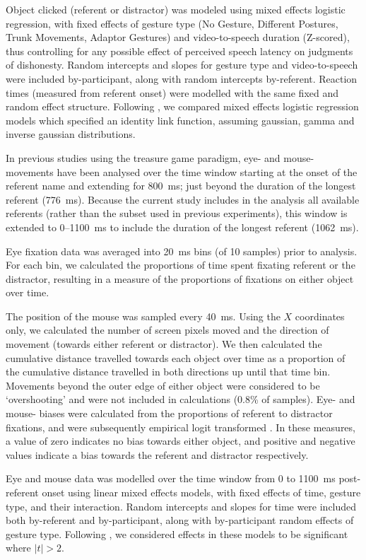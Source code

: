 \documentclass[a4paper,man,natbib]{apa6}
\begin{document}
Object clicked (referent or distractor) was modeled using mixed effects logistic regression, with fixed effects of gesture type (No Gesture, Different Postures, Trunk Movements, Adaptor Gestures) and video-to-speech duration (Z-scored), thus controlling for any possible effect of perceived speech latency on judgments of dishonesty.
Random intercepts and slopes for gesture type and video-to-speech were included by-participant, along with random intercepts by-referent.
Reaction times (measured from referent onset) were modelled with the same fixed and random effect structure.
Following \citet{Lo2015}, we compared mixed effects logistic regression models which specified an identity link function, assuming gaussian, gamma and inverse gaussian distributions.

In previous studies using the treasure game paradigm, eye- and mouse- movements have been analysed over the time window starting at the onset of the referent name and extending for 800~ms; just beyond the duration of the longest referent (776~ms). 
Because the current study includes in the analysis all available referents (rather than the subset used in previous experiments), this window is extended to 0--1100~ms to include the duration of the longest referent (1062~ms).

Eye fixation data was averaged into 20~ms bins (of 10 samples) prior to analysis.
For each bin, we calculated the proportions of time spent fixating referent or the distractor, resulting in a measure of the proportions of fixations on either object over time.

The position of the mouse was sampled every 40~ms.
Using the $X$ coordinates only, we calculated the number of screen pixels moved and the direction of movement (towards either referent or distractor).
We then calculated the cumulative distance travelled towards each object over time as a proportion of the cumulative distance travelled in both directions up until that time bin.
Movements beyond the outer edge of either object were considered to be `overshooting' and were not included in calculations (0.8\% of samples).
Eye- and mouse- biases were calculated from the proportions of referent to distractor fixations, and were subsequently empirical logit transformed \citep{Barr2008}. 
In these measures, a value of zero indicates no bias towards either object, and positive and negative values indicate a bias towards the referent and distractor respectively.

Eye and mouse data was modelled over the time window from 0 to 1100~ms post-referent onset using linear mixed effects models, with fixed effects of time, gesture type, and their interaction.
Random intercepts and slopes for time were included both by-referent and by-participant, along with by-participant random effects of gesture type.
Following \citet{Baayen2008}, we considered effects in these models to be significant where $|t|>2$.
\end{document}
